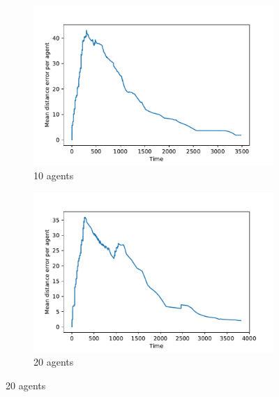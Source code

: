 \documentclass{article}
\begin{document}
\begin{figure}[ht]
	\centering
	\begin{subfigure}[b]{0.45\textwidth}
		\centering
		\includegraphics[width=\textwidth]{figures/baseline/baseline_errors_10.pdf}
		\caption{10 agents}\label{fig:benchmark_gcs:10}
	\end{subfigure}
	\hfill
	\begin{subfigure}[b]{0.45\textwidth}
		\centering
		\includegraphics[width=\textwidth]{figures/baseline/baseline_errors_20.pdf}
		\caption{20 agents}\label{fig:benchmark_gcs:20}
	\end{subfigure}
	

\end{figure}
\end{document}
